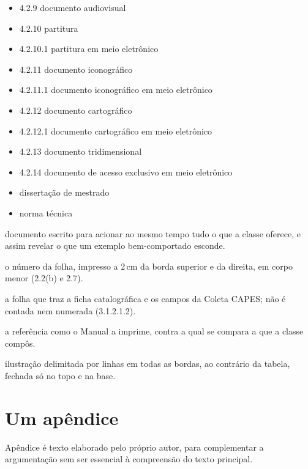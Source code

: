 \documentclass[dsc,pdfa,coorientador,dadoscoleta]{ufrj}
\begin{document}
\begin{itemize}
    \item 4.2.9 documento audiovisual \citep{m-429,pt-429}
    \item 4.2.10 partitura \citep{m-42101,pt-42101}
    \item 4.2.10.1 partitura em meio eletrônico \citep{m-42102,pt-42102}
    \item 4.2.11 documento iconográfico \citep{m-42111,pt-42111}
    \item 4.2.11.1 documento iconográfico em meio eletrônico \citep{m-42112,pt-42112}
    \item 4.2.12 documento cartográfico \citep{m-42121,pt-42121}
    \item 4.2.12.1 documento cartográfico em meio eletrônico \citep{m-42122,pt-42122}
    \item 4.2.13 documento tridimensional \citep{m-42131,pt-42131}
    \item 4.2.14 documento de acesso exclusivo em meio eletrônico \citep{m-4214,pt-4214}
    \item dissertação de mestrado \citep{m-diss,pt-diss}
    \item norma técnica \citep{m-norma,pt-norma}
  \end{itemize}

  \backmatter
  \nocite{article-example,manualbib}
  \printbibliography

  \begin{theglossary}
    \item[Adversativo] documento escrito para acionar ao mesmo tempo
      tudo o que a classe oferece, e assim revelar o que um exemplo
      bem-comportado esconde.
    \item[Fólio] o número da folha, impresso a 2\,cm da borda superior
      e da direita, em corpo menor (2.2(b) e 2.7).
    \item[Folha adicional] a folha que traz a ficha catalográfica e os
      campos da Coleta CAPES; não é contada nem numerada (3.1.2.1.2).
    \item[Gabarito] a referência como o Manual a imprime, contra a qual
      se compara a que a classe compôs.
    \item[Quadro] ilustração delimitada por linhas em todas as bordas,
      ao contrário da tabela, fechada só no topo e na base.
  \end{theglossary}

  \appendix
  \chapter{Um apêndice}
  Apêndice é texto elaborado pelo próprio autor, para complementar a argumentação sem ser essencial à compreensão do texto principal.
\end{document}

